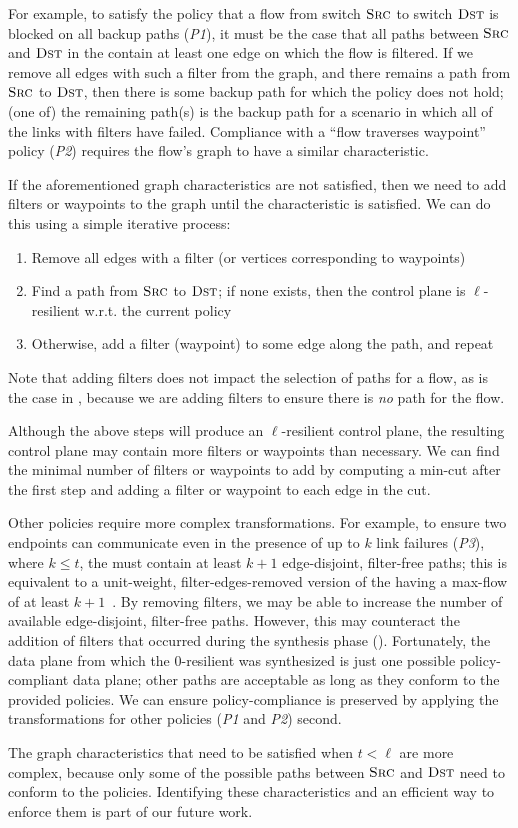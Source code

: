 For example, to satisfy the policy that a flow from switch $\textsc{Src}$ to
switch $\textsc{Dst}$ is blocked on all backup paths ({\em P1}), it must be the
case that all paths between $\textsc{Src}$ and $\textsc{Dst}$ in the \ARC contain
at least one edge on which the flow is filtered. If we remove all edges with
such a filter from the graph, and there remains a path from $\textsc{Src}$ to
$\textsc{Dst}$, then there is some backup path for which the policy does not
hold; (one of) the remaining path(s) is the backup path for a scenario in
which all of the links with filters have failed. Compliance with a ``flow
traverses waypoint'' policy ({\em P2}) requires the flow's graph to have a
similar characteristic.

If the aforementioned graph characteristics are not satisfied, then we need to
add filters or waypoints to the graph until the characteristic is satisfied.
We can do this using a simple iterative process: 
\begin{enumerate}
\vspace{-1ex}
\setlength{\topsep}{0pt}
\setlength{\itemsep}{0em}
\setlength{\parskip}{0pt}
\setlength{\parsep}{0pt}
\item Remove all edges with a filter (or vertices corresponding to waypoints) 
\item Find a path from $\textsc{Src}$ to $\textsc{Dst}$; if none exists,
    then the control plane is $\ell$-resilient w.r.t. the current policy
\item Otherwise, add a filter (waypoint) to some edge along the path, and repeat
\vspace{-1ex}
\end{enumerate}
Note that adding filters does not impact the selection of paths for a flow, as
is the case in , because we are adding filters to
ensure there is {\em no} path for the flow.

Although the above steps will produce an $\ell$-resilient control plane, the
resulting control plane may contain more filters or waypoints than necessary.
We can find the minimal number of filters or waypoints to add by computing a
min-cut after the first step and adding a filter or waypoint to each edge in the cut. 

Other policies require more complex transformations. For example, to ensure
two endpoints can communicate even in the presence of up to $k$ link failures
({\em P3}), where $k \leq t$, the \ARC must contain at least $k+1$
edge-disjoint, filter-free paths; this is equivalent to a unit-weight,
filter-edges-removed version of the \ARC having a max-flow of at least
$k+1$~\cite{arc}. By removing filters, we may be able to increase the number
of available edge-disjoint, filter-free paths. However, this may counteract
the addition of filters that occurred during the \ARC synthesis phase
(). Fortunately, the data plane from which the
0-resilient \ARC was synthesized is just one possible policy-compliant data
plane; other paths are acceptable as long as they conform to the provided
policies. We can ensure policy-compliance is preserved by applying the
transformations for other policies ({\em P1} and {\em P2}) second.

The graph characteristics that need to be satisfied when $t < \ell$ are more
complex, because only some of the possible paths between $\textsc{Src}$ and
$\textsc{Dst}$ need to conform to the policies. Identifying these
characteristics and an efficient way to enforce them is part of our future
work.
